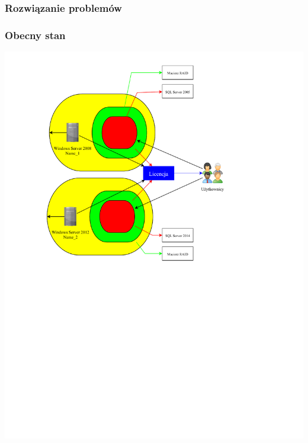 \documentclass[a4paper, 12pt]{article}
\begin{document}
			\subsubsection{Rozwiązanie problemów}
				\subsubsection{Obecny stan}
			  \includegraphics[scale=0.7]{obecny_stan}
\end{document}
